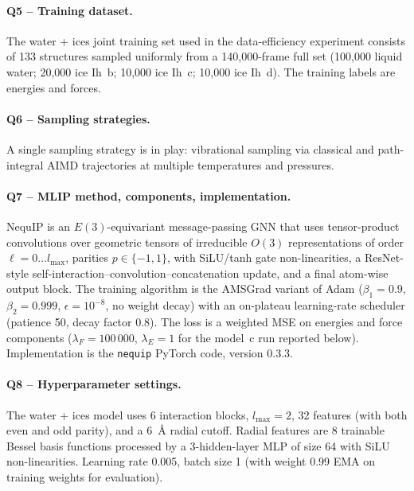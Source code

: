 \paragraph{Q5 -- Training dataset.}
The water + ices joint training set used in the data-efficiency
experiment consists of 133 structures sampled uniformly from a
140{,}000-frame full set (100{,}000 liquid water; 20{,}000 ice
Ih~b; 10{,}000 ice Ih~c; 10{,}000 ice Ih~d). The training labels
are energies and forces.


\paragraph{Q6 -- Sampling strategies.}
A single sampling strategy is in play: vibrational sampling via
classical and path-integral AIMD trajectories at multiple
temperatures and pressures.


\paragraph{Q7 -- MLIP method, components, implementation.}
NequIP is an $E(3)$-equivariant message-passing GNN that uses
tensor-product convolutions over geometric tensors of irreducible
$O(3)$ representations of order $\ell=0\dots l_{\max}$, parities
$p\in\{-1,1\}$, with SiLU/tanh gate non-linearities, a ResNet-style
self-interaction--convolution--concatenation update, and a final
atom-wise output block. The training algorithm is the AMSGrad
variant of Adam ($\beta_1=0.9$, $\beta_2=0.999$, $\epsilon=10^{-8}$,
no weight decay) with an on-plateau learning-rate scheduler
(patience 50, decay factor 0.8). The loss is a weighted MSE on
energies and force components ($\lambda_F=100\,000$, $\lambda_E=1$
for the model~c run reported below). Implementation is the
\texttt{nequip} PyTorch code, version 0.3.3.


\paragraph{Q8 -- Hyperparameter settings.}
The water + ices model uses 6 interaction blocks, $l_{\max}=2$, 32
features (with both even and odd parity), and a 6~\AA{} radial
cutoff. Radial features are 8 trainable Bessel basis functions
processed by a 3-hidden-layer MLP of size 64 with SiLU
non-linearities. Learning rate 0.005, batch size 1 (with weight
0.99 EMA on training weights for evaluation).


